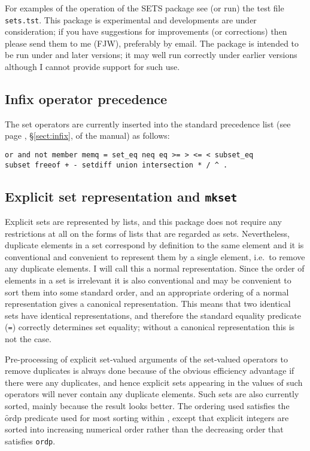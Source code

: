 For examples of the operation of the SETS package see (or run) the
test file \texttt{sets.tst}.  This package is experimental and
developments are under consideration; if you have suggestions for
improvements (or corrections) then please send them to me (FJW),
preferably by email.  The package is intended to be run under
 and later versions; it may well run correctly under earlier
versions although I cannot provide support for such use.


\subsection{Infix operator precedence}

The set operators are currently inserted into the standard \REDUCE
precedence list (see page \pageref{sect:infix}, \S\ref{sect:infix}, of the \REDUCE manual) as
follows:
\begin{verbatim}
or and not member memq = set_eq neq eq >= > <= < subset_eq
subset freeof + - setdiff union intersection * / ^ .
\end{verbatim}


\subsection{Explicit set representation and \texttt{mkset}}
\hypertarget{operator:SETS_MKSET}{}

Explicit sets are represented by lists, and this package does not
require any restrictions at all on the forms of lists that are
regarded as sets.  Nevertheless, duplicate elements in a set
correspond by definition to the same element and it is conventional
and convenient to represent them by a single element, i.e.\ to remove
any duplicate elements.  I will call this a normal representation.
Since the order of elements in a set is irrelevant it is also
conventional and may be convenient to sort them into some standard
order, and an appropriate ordering of a normal representation gives a
canonical representation.  This means that two identical sets have
identical representations, and therefore the standard \REDUCE equality
predicate (\texttt{=}) 
correctly determines set equality; without a
canonical representation this is not the case.

Pre-processing of explicit set-valued arguments of the set-valued
operators to remove duplicates is always done because of the obvious
efficiency advantage if there were any duplicates, and hence explicit
sets appearing in the values of such operators will never contain any
duplicate elements.  Such sets are also currently sorted, mainly
because the result looks better.  The ordering used satisfies the \f{ordp}
predicate used for most sorting within \REDUCE, except that
explicit integers are sorted into increasing numerical order rather
than the decreasing order that satisfies \texttt{ordp}.

